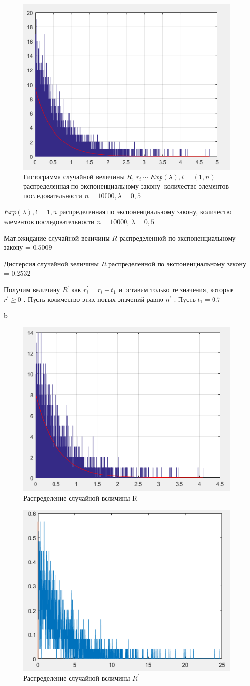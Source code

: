 \begin{figure}[h]
	\centering\includegraphics[width=0.4\linewidth]{img/kich_bur/image1.png}
	\caption{Гистограмма случайной величины $ R $, $r_i \sim Exp(\lambda),i=(1,n) $ распределенная по экспоненциальному закону, количество элементов последовательности $ n=10000, \lambda=0,5 $}
	\label{fig:img1}
\end{figure}

$Exp(\lambda),i=1,n$
распределенная по экспоненциальному закону, количество элементов последовательности
$n=10000$, $\lambda=0,5$ 


Мат.ожидание случайной величины $ R $ распределенной по экспоненциальному
закону = $ 0.5009  $

Дисперсия случайной величины $ R $ распределенной по экспоненциальному
закону = $ 0.2532 $ 

Получим величину $R^{'}$ как $r_{i}^{'}=r_{i}-t_{1}$ и оставим
только те значения, которые $r^{'}\geq0$ . Пусть количество этих
новых значений равно $n^{'}$ . Пусть $t_{1}=0.7$

b\begin{figure}[h]
	\centering
	\includegraphics[width=0.4\linewidth]{img/kich_bur/image2.png}
	\caption{Распределение случайной величины R}
	\label{fig:img2}
\end{figure}

\begin{figure}[h]
	\centering
	\includegraphics[width=0.4\linewidth]{img/kich_bur/image3.png}
	\caption{Распределение случайной величины $ R^{'} $}
	\label{fig:img3}
\end{figure}

